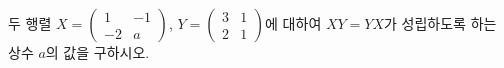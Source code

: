 \hspace*{2mm}\begin{minipage}[t]{\dimexpr\linewidth-2mm\relax}\vspace{0pt}
두 행렬 $X=\begin{pmatrix} 1 & -1 \\ -2 & a \end{pmatrix}$, $Y=\begin{pmatrix} 3 & 1 \\ 2 & 1 \end{pmatrix}$에 대하여 $XY=YX$가 성립하도록 하는 상수 $a$의 값을 구하시오.\end{minipage}
